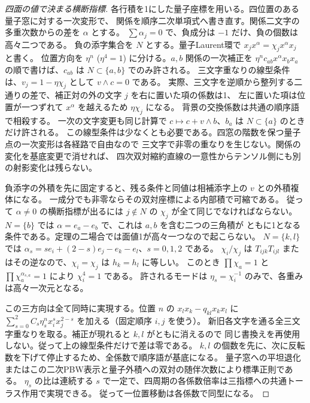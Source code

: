 \begin{proof}[四面の値で決まる横断指標]
各行積を1にした量子座標を用いる。四位置のある量子窓に対する一次変形で、
関係を順序二次単項式へ書き直す。関係二文字の多重次数からの差を $\alpha$ とする。
$\sum\alpha_j=0$ で、負成分は $-1$ だけ、負の個数は高々二つである。
負の添字集合を $N$ とする。量子Laurent環で $x_j x^\alpha=\chi_j x^\alpha x_j$ と書く。
位置方向を $\eta^n$ ($\eta^4=1$) に分ける。$a,b$ 関係の一次補正を
$\eta^n c_{ab}x^\alpha x_bx_a$ の順で書けば、$c_{ab}$ は $N\subset\{a,b\}$ でのみ許される。
三文字重なりの線型条件は、$v_j=1-\eta\chi_j$ として $v\wedge c=0$ である。
実際、三文字を逆順から整列する二通りの差で、補正対の外の文字 $j$ を右に置いた項の係数は1、
左に置いた項は位置が一つずれて $x^\alpha$ を越えるため $\eta\chi_j$ になる。
背景の交換係数は共通の順序語で相殺する。
一次の文字変更も同じ計算で $c\mapsto c+v\wedge b$、$b_a$ は $N\subset\{a\}$ のときだけ許される。
この線型条件は少なくとも必要である。四窓の階数を保つ量子点の一次変形は各経路で自由なので
三文字で非零の重なりを生じない。関係の変化を基底変更で消せれば、
四次双対縮約直線の一意性からテンソル側にも別の射影変化は残らない。

負添字の外積を先に固定すると、残る条件と同値は相補添字上の $v$ との外積複体になる。
一成分でも非零ならその双対座標による内部積で可縮である。
従って $\alpha\ne0$ の横断指標が出るには $j\notin N$ の $\chi_j$ が全て同じでなければならない。
$N=\{b\}$ では $\alpha=e_a-e_b$ で、これは $a,b$ を含む二つの三角積が
ともに1となる条件である。定理の二場合では面値1が高々一つなので起こらない。
$N=\{k,l\}$ では $\alpha_s=se_i+(2-s)e_j-e_k-e_l$、$s=0,1,2$ である。
$\chi_i/\chi_j$ は $T_{ijk}T_{ijl}$ またはその逆なので、$\chi_i=\chi_j$ は $h_k=h_l$ に等しい。
このとき $\prod\chi_a=1$ と $\prod\chi_a^{\alpha_{s,a}}=1$ により $\chi_i^4=1$ である。
許されるモードは $\eta_s=\chi_i^{-1}$ のみで、各重みは高々一次元となる。

この三方向は全て同時に実現する。位置 $n$ の $x_lx_k-q_{kl}x_kx_l$ に
$\sum_{s=0}^2 C_s\eta_s^n x_i^s x_j^{2-s}$ を加える（固定順序 $i,j$ を使う）。
新旧各文字を通る全三文字重なりを取る。補正が現れると $k,l$ がともに消えるので
同じ書換えを再使用しない。従って上の線型条件だけで差は零である。
$k,l$ の個数を先に、次に反転数を下げて停止するため、全係数で順序語が基底になる。
量子窓への平坦退化またはこの二次PBW表示と量子外積への双対の随伴次数により標準正則である。
$\eta_s$ の比は連続する $s$ で一定で、四周期の各係数倍率は三指標への共通トーラス作用で実現できる。
従って一位置移動は各係数で同型になる。
\end{proof}


